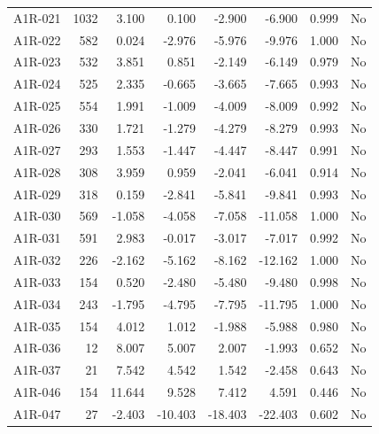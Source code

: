 \begin{longtable}{lrrrrrrl}
A1R-021 & 1032 & 3.100 & 0.100 & -2.900 & -6.900 & 0.999 & No \\
A1R-022 & 582 & 0.024 & -2.976 & -5.976 & -9.976 & 1.000 & No \\
A1R-023 & 532 & 3.851 & 0.851 & -2.149 & -6.149 & 0.979 & No \\
A1R-024 & 525 & 2.335 & -0.665 & -3.665 & -7.665 & 0.993 & No \\
A1R-025 & 554 & 1.991 & -1.009 & -4.009 & -8.009 & 0.992 & No \\
A1R-026 & 330 & 1.721 & -1.279 & -4.279 & -8.279 & 0.993 & No \\
A1R-027 & 293 & 1.553 & -1.447 & -4.447 & -8.447 & 0.991 & No \\
A1R-028 & 308 & 3.959 & 0.959 & -2.041 & -6.041 & 0.914 & No \\
A1R-029 & 318 & 0.159 & -2.841 & -5.841 & -9.841 & 0.993 & No \\
A1R-030 & 569 & -1.058 & -4.058 & -7.058 & -11.058 & 1.000 & No \\
A1R-031 & 591 & 2.983 & -0.017 & -3.017 & -7.017 & 0.992 & No \\
A1R-032 & 226 & -2.162 & -5.162 & -8.162 & -12.162 & 1.000 & No \\
A1R-033 & 154 & 0.520 & -2.480 & -5.480 & -9.480 & 0.998 & No \\
A1R-034 & 243 & -1.795 & -4.795 & -7.795 & -11.795 & 1.000 & No \\
A1R-035 & 154 & 4.012 & 1.012 & -1.988 & -5.988 & 0.980 & No \\
A1R-036 & 12 & 8.007 & 5.007 & 2.007 & -1.993 & 0.652 & No \\
A1R-037 & 21 & 7.542 & 4.542 & 1.542 & -2.458 & 0.643 & No \\
A1R-046 & 154 & 11.644 & 9.528 & 7.412 & 4.591 & 0.446 & No \\
A1R-047 & 27 & -2.403 & -10.403 & -18.403 & -22.403 & 0.602 & No \\
\bottomrule
\end{longtable}
\endgroup
